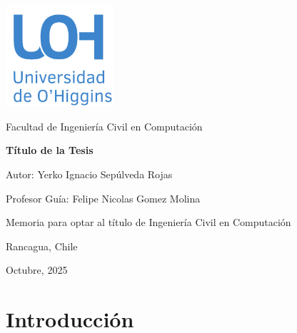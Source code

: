 \documentclass[12pt,a4paper]{report}
\begin{document}
\begin{titlepage}
    \centering
    {\includegraphics[width=0.3\textwidth]{data/logo.png}\par}
    


    {\Large\sffamily\textcolor{uoh}{Facultad de Ingeniería Civil en Computación}\par}
    \vspace{3cm}
    {\huge\bfseries Título de la Tesis \par}
    \vspace{5cm}

    {\normalsize Autor: Yerko Ignacio Sepúlveda Rojas \par}
    {\normalsize Profesor Guía: Felipe Nicolas Gomez Molina \par}
    \vspace{4cm}
    {\normalsize Memoria para optar al título de Ingeniería Civil en Computación \par}
    \vfill
    {\normalsize Rancagua, Chile \par}
    {\normalsize Octubre, 2025 \par}
\end{titlepage}
\tableofcontents
\listoffigures
\listoftables

\clearpage
{} %

\chapter*{Introducción}
\setcounter{page}{1}   %
\end{document}
